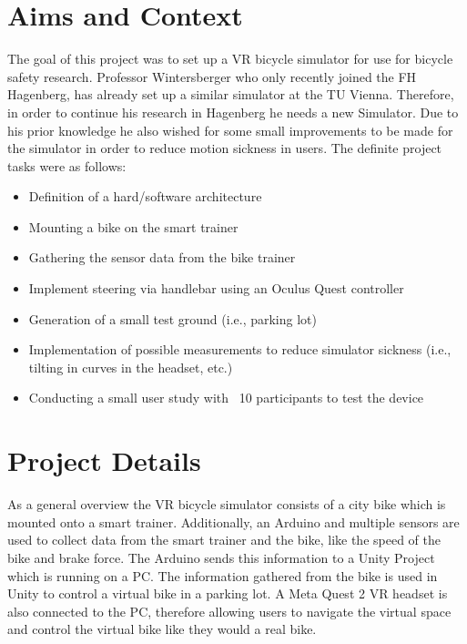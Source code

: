\documentclass[english,notitlepage,smartquotes]{hgbreport}
\begin{document}
\chapter{Aims and Context}
\label{chapAims}
The goal of this project was to set up a VR bicycle simulator for use for bicycle safety research. Professor Wintersberger who only recently joined the FH Hagenberg, has already set up a similar simulator at the TU Vienna. Therefore, in order to continue his research in Hagenberg he needs a new Simulator. Due to his prior knowledge he also wished for some small improvements to be made for the simulator in order to reduce motion sickness in users.  
The definite project tasks were as follows:
\begin{itemize}
	\item Definition of a hard/software architecture 
	\item Mounting a bike on the smart trainer 
	\item Gathering the sensor data from the bike trainer 
	\item Implement steering via handlebar using an Oculus Quest controller 
	\item Generation of a small test ground (i.e., parking lot)  
	\item Implementation of possible measurements to reduce simulator sickness (i.e., tilting in curves in the headset, etc.) 
	\item Conducting a small user study with ~10 participants to test the device 
\end{itemize}

\chapter{Project Details}
As a general overview the VR bicycle simulator consists of a city bike which is mounted onto a smart trainer. 
Additionally, an Arduino and multiple sensors are used to collect data from the smart trainer and the bike, like the speed of the bike and brake force. 
The Arduino sends this information to a Unity Project which is running on a PC. The information gathered from the bike is used in Unity to control a virtual bike in a parking lot. A Meta Quest 2 VR headset is also connected to the PC, therefore allowing users to navigate the virtual space and control the virtual bike like they would a real bike.
\end{document}
